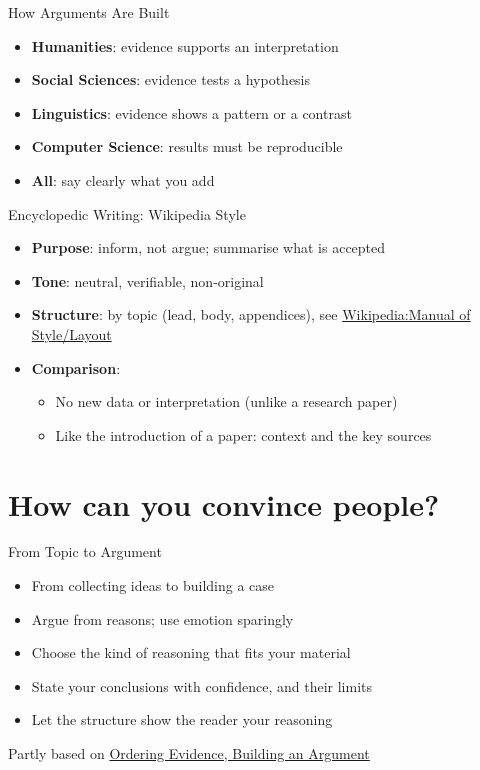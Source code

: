 \documentclass[aspectratio=169]{beamer}
\begin{document}
\begin{frame}{How Arguments Are Built}
\begin{itemize}
  \item \textbf{Humanities}: evidence supports an interpretation
  \item \textbf{Social Sciences}: evidence tests a hypothesis
  \item \textbf{Linguistics}: evidence shows a pattern or a contrast
  \item \textbf{Computer Science}: results must be reproducible
  \item \textbf{All}: say clearly what you add
\end{itemize}
\end{frame}

\begin{frame}{Encyclopedic Writing: Wikipedia Style}
\begin{itemize}
  \item \textbf{Purpose}: inform, not argue; summarise what is accepted
  \item \textbf{Tone}: neutral, verifiable, non-original
  \item \textbf{Structure}: by topic (lead, body, appendices), see
    \href{https://en.wikipedia.org/wiki/Wikipedia:Manual_of_Style/Layout}{Wikipedia:Manual of Style/Layout}
  \item \textbf{Comparison}:
    \begin{itemize}
      \item No new data or interpretation (unlike a research paper)
      \item Like the introduction of a paper: context and the key sources
    \end{itemize}
\end{itemize}
\end{frame}







\section{How can you convince people?}

\begin{frame}{From Topic to Argument}
\begin{itemize}
  \item From collecting ideas to building a case
  \item Argue from reasons; use emotion sparingly
  \item Choose the kind of reasoning that fits your material
  \item State your conclusions with confidence, and their limits
  \item Let the structure show the reader your reasoning
  \end{itemize}
  \vfill
Partly based on \href{https://mlpp.pressbooks.pub/writinghandbook/chapter/ordering-evidence-building-an-argument/}{Ordering Evidence, Building an Argument} \citep[Ch.~4]{writinghandbook}
\end{frame}
\end{document}
